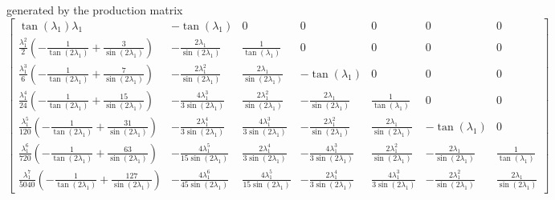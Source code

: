 generated by the production matrix
\begin{displaymath}
\left[\begin{matrix}\tan{\left (\lambda_{1} \right )} \lambda_{1} & - \tan{\left (\lambda_{1} \right )} & 0 & 0 & 0 & 0 & 0\\\frac{\lambda_{1}^{2}}{2} \left(- \frac{1}{\tan{\left (2 \lambda_{1} \right )}} + \frac{3}{\sin{\left (2 \lambda_{1} \right )}}\right) & - \frac{2 \lambda_{1}}{\sin{\left (2 \lambda_{1} \right )}} & \frac{1}{\tan{\left (\lambda_{1} \right )}} & 0 & 0 & 0 & 0\\\frac{\lambda_{1}^{3}}{6} \left(- \frac{1}{\tan{\left (2 \lambda_{1} \right )}} + \frac{7}{\sin{\left (2 \lambda_{1} \right )}}\right) & - \frac{2 \lambda_{1}^{2}}{\sin{\left (2 \lambda_{1} \right )}} & \frac{2 \lambda_{1}}{\sin{\left (2 \lambda_{1} \right )}} & - \tan{\left (\lambda_{1} \right )} & 0 & 0 & 0\\\frac{\lambda_{1}^{4}}{24} \left(- \frac{1}{\tan{\left (2 \lambda_{1} \right )}} + \frac{15}{\sin{\left (2 \lambda_{1} \right )}}\right) & - \frac{4 \lambda_{1}^{3}}{3 \sin{\left (2 \lambda_{1} \right )}} & \frac{2 \lambda_{1}^{2}}{\sin{\left (2 \lambda_{1} \right )}} & - \frac{2 \lambda_{1}}{\sin{\left (2 \lambda_{1} \right )}} & \frac{1}{\tan{\left (\lambda_{1} \right )}} & 0 & 0\\\frac{\lambda_{1}^{5}}{120} \left(- \frac{1}{\tan{\left (2 \lambda_{1} \right )}} + \frac{31}{\sin{\left (2 \lambda_{1} \right )}}\right) & - \frac{2 \lambda_{1}^{4}}{3 \sin{\left (2 \lambda_{1} \right )}} & \frac{4 \lambda_{1}^{3}}{3 \sin{\left (2 \lambda_{1} \right )}} & - \frac{2 \lambda_{1}^{2}}{\sin{\left (2 \lambda_{1} \right )}} & \frac{2 \lambda_{1}}{\sin{\left (2 \lambda_{1} \right )}} & - \tan{\left (\lambda_{1} \right )} & 0\\\frac{\lambda_{1}^{6}}{720} \left(- \frac{1}{\tan{\left (2 \lambda_{1} \right )}} + \frac{63}{\sin{\left (2 \lambda_{1} \right )}}\right) & - \frac{4 \lambda_{1}^{5}}{15 \sin{\left (2 \lambda_{1} \right )}} & \frac{2 \lambda_{1}^{4}}{3 \sin{\left (2 \lambda_{1} \right )}} & - \frac{4 \lambda_{1}^{3}}{3 \sin{\left (2 \lambda_{1} \right )}} & \frac{2 \lambda_{1}^{2}}{\sin{\left (2 \lambda_{1} \right )}} & - \frac{2 \lambda_{1}}{\sin{\left (2 \lambda_{1} \right )}} & \frac{1}{\tan{\left (\lambda_{1} \right )}}\\\frac{\lambda_{1}^{7}}{5040} \left(- \frac{1}{\tan{\left (2 \lambda_{1} \right )}} + \frac{127}{\sin{\left (2 \lambda_{1} \right )}}\right) & - \frac{4 \lambda_{1}^{6}}{45 \sin{\left (2 \lambda_{1} \right )}} & \frac{4 \lambda_{1}^{5}}{15 \sin{\left (2 \lambda_{1} \right )}} & - \frac{2 \lambda_{1}^{4}}{3 \sin{\left (2 \lambda_{1} \right )}} & \frac{4 \lambda_{1}^{3}}{3 \sin{\left (2 \lambda_{1} \right )}} & - \frac{2 \lambda_{1}^{2}}{\sin{\left (2 \lambda_{1} \right )}} & \frac{2 \lambda_{1}}{\sin{\left (2 \lambda_{1} \right )}}\end{matrix}\right]
\end{displaymath}
